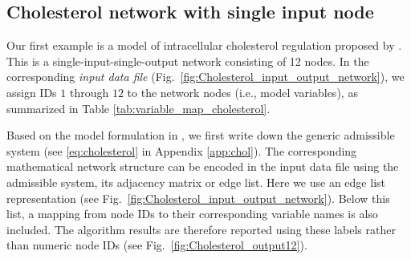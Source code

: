 \documentclass[pdflatex,sn-basic,Numbered]{sn-jnl}
\theoremstyle{thmstyleone}%
\numberwithin{equation}{section}
\begin{document}
\subsection{Cholesterol network with single input node}\label{sec:chol}

Our first example is a model of intracellular cholesterol regulation proposed by \cite{pool2018integrated}. This is a single-input-single-output network consisting of 12 nodes. In the corresponding \emph{input data file} (Fig.~\ref{fig:Cholesterol_input_output_network}), we assign IDs $1$ through $12$ to the network nodes (i.e., model variables), as summarized in Table \ref{tab:variable_map_cholesterol}. 

\begin{table}[h!]
\centering
{}
\caption{Node IDs, variable names and biological meanings for the cholesterol model. LDL: low density lipoprotein; VLDL: very low density lipoprotein.}
\label{tab:variable_map_cholesterol}
\end{table}

Based on the model formulation in \cite{pool2018integrated}, we first write down the generic admissible system (see \eqref{eq:cholesterol} in Appendix \ref{app:chol}). The corresponding mathematical network structure can be encoded in the input data file using the admissible system, its adjacency matrix or edge list. Here we use an edge list representation (see Fig.~\ref{fig:Cholesterol_input_output_network}). Below this list, a mapping from node IDs to their corresponding variable names is also included. The algorithm results are therefore reported using these labels rather than numeric node IDs (see Fig.~\ref{fig:Cholesterol_output12}). 
\end{document}
